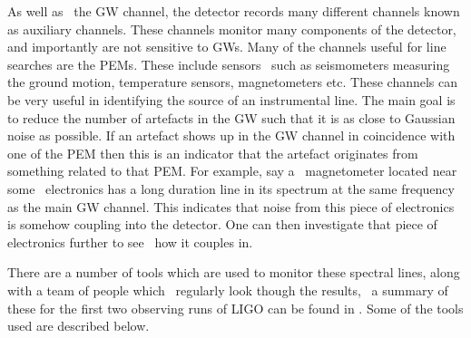 %
As well as~ the \gls{GW} channel, the detector
records many different channels known as auxiliary channels.  These channels
monitor many components of the detector, and importantly are not sensitive to
\glspl{GW}.  Many of the channels useful for line searches are the \glspl{PEM}.
These include sensors~
such as seismometers measuring the ground motion, temperature sensors,
magnetometers etc.  These channels can be very useful in identifying the source
of an instrumental line.  The main goal is to reduce the number of artefacts in
the \gls{GW} such that it is as close to Gaussian noise as possible.  If an
artefact shows up in the \gls{GW} channel in coincidence with one of the
\gls{PEM} then this is an indicator that the artefact originates from something
related to that \gls{PEM}.  For example, say a~ magnetometer located near some~
electronics has a long duration line in its spectrum at the same frequency as
the main \gls{GW} channel.  This indicates that noise from this piece of
electronics is somehow coupling into the detector.  One can then investigate
that piece of electronics further to see~ how it couples in.

%

There are a number of tools which are used to monitor these spectral lines,
along with a team of people which~ regularly look though the
results,~ a summary
of these for the first two observing runs of \gls{LIGO} can be found in
\citep{covas2018IdentificationMitigation}.  Some of the tools used are
described below.~ 

